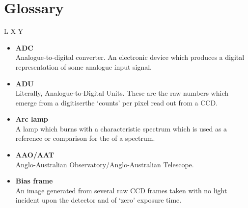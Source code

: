 {{%
\newpage
\section{Glossary}

\begin{htmlonly}
L
X
Y
\end{htmlonly}

\scspec{\small}{ }

\begin{itemize}

\item {\bf\label{gl_adc}ADC}\\
      Analogue-to-digital converter.  An electronic device which produces
      a digital representation of some analogue input signal.

\item {\bf\label{gl_adu}ADU}\\
      Literally, Analogue-to-Digital Units.  These are the raw numbers
      which emerge from a digitiser\scspec{---}{ - }the `counts' per pixel
      read out from a CCD.

\item {\bf\label{gl_arc_lamp}Arc lamp}\\
      A lamp which burns with a characteristic spectrum which is used as
      a reference or comparison for the
       of a spectrum.

\item {\bf\label{gl_aao_aat}AAO/AAT}\\
      Anglo-Australian Observatory/Anglo-Australian Telescope.

\item {\bf\label{gl_bias_frame}Bias frame}\\
      An image generated from several raw CCD frames taken with no
      light incident upon the detector and of `zero' exposure time.


\end{itemize}}}
